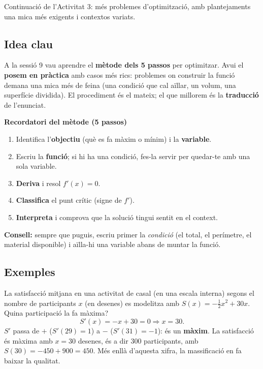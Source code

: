 %
{Continuació de l'Activitat 3: més problemes d'optimització, amb plantejaments una mica més exigents i contextos variats.}

\subsection{Idea clau}

A la sessió 9 vau aprendre el \textbf{mètode dels 5 passos} per optimitzar. Avui el
\textbf{posem en pràctica} amb casos més rics: problemes on construir la funció demana
una mica més de feina (una condició que cal aïllar, un volum, una superfície dividida).
El procediment és el mateix; el que millorem és la \textbf{traducció} de l'enunciat.

\begin{idea}
\textbf{Recordatori del mètode (5 passos)}
\begin{enumerate}[leftmargin=1.6em, itemsep=1pt]
  \item Identifica l'\textbf{objectiu} (què es fa màxim o mínim) i la \textbf{variable}.
  \item Escriu la \textbf{funció}; si hi ha una condició, fes-la servir per quedar-te amb
        una sola variable.
  \item \textbf{Deriva} i resol $f'(x)=0$.
  \item \textbf{Classifica} el punt crític (signe de $f'$).
  \item \textbf{Interpreta} i comprova que la solució tingui sentit en el context.
\end{enumerate}
\textbf{Consell:} sempre que puguis, escriu primer la \emph{condició} (el total, el
perímetre, el material disponible) i aïlla-hi una variable abans de muntar la funció.
\end{idea}

\subsection{Exemples}

\begin{exemple}
La satisfacció mitjana en una activitat de casal (en una escala interna) segons el
nombre de participants $x$ (en desenes) es modelitza amb $S(x)=-\tfrac{1}{2}x^2+30x$.
Quina participació la fa màxima?
\[
S'(x)=-x+30=0 \Rightarrow x=30.
\]
$S'$ passa de $+$ ($S'(29)=1$) a $-$ ($S'(31)=-1$): és un \textbf{màxim}. La satisfacció
és màxima amb $x=30$ desenes, és a dir $300$ participants, amb
$S(30)=-450+900=450$. Més enllà d'aquesta xifra, la massificació en fa baixar la
qualitat.
\end{exemple}

